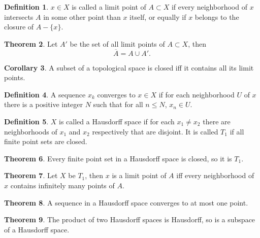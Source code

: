 \documentclass[twocolumn]{article}
\theoremstyle{definition}
\newtheorem{definition}{Definition}[section]
\newtheorem{theorem}[definition]{Theorem}
\newtheorem{corollary}[definition]{Corollary}
\begin{document}
\begin{definition}
    $x \in X$ is called a limit point of $A \subset X$ if every neighborhood of $x$ intersects $A$
    in some other point than $x$ itself, or equally if $x$ belongs to the closure of $A-\{x\}$.
\end{definition}
\begin{theorem}
    Let $A'$ be the set of all limit points of $A\subset X$, then
    \begin{equation}
        \overline{A} = A \cup A'.
    \end{equation}
\end{theorem}
\begin{corollary}
    A subset of a topological space is closed iff it contains all its limit points.
\end{corollary}
\begin{definition}
    A sequence $x_k$ converges to $x\in X$ if for each neighborhood $U$ of $x$ there is a positive integer $N$ such that for all $n\leq N$, $x_n \in U$.
\end{definition}
\begin{definition}
    $X$ is called a Hausdorff space if for each $x_1 \neq x_2$ there are neighborhoods of $x_1$ and $x_2$ respectively that are disjoint.
    It is called $T_1$ if all finite point sets are closed.
\end{definition}
\begin{theorem}
    Every finite point set in a Hausdorff space is closed, so it is $T_1$.
\end{theorem}
\begin{theorem}
    Let $X$ be $T_1$, then $x$ is a limit point of $A$ iff every neighborhood of $x$ contains infinitely many points of $A$.
\end{theorem}
\begin{theorem}
    A sequence in a Hausdorff space converges to at most one point. 
\end{theorem}
\begin{theorem}
    The product of two Hausdorff spaces is Hausdorff, so is a subspace of a Hausdorff space.
\end{theorem}
\end{document}
